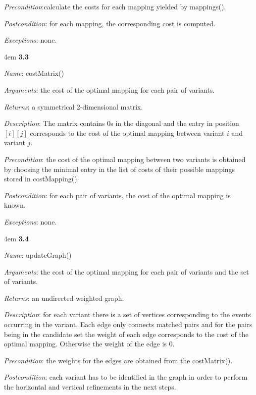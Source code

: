 \documentclass[notitlepage]{article}
\begin{document}
\begin{flushleft}
\textit{Precondition}:calculate the costs for each mapping yielded by mappings().

\textit{Postcondition}: for each mapping, the corresponding cost is computed.

\textit{Exceptions}: none.
\par
\endgroup


\medskip

\par
\begingroup
\leftskip4em
\textbf{3.3} 

\textit{Name}: costMatrix()

\textit{Arguments}: the cost of the optimal mapping for each pair of variants.

\textit{Returns}: a symmetrical 2-dimensional matrix.

\textit{Description}: The matrix contains 0s in the diagonal and the entry in position $[i][j]$ corresponds to the cost of the optimal mapping between variant $i$ and variant $j$. 

\textit{Precondition}: the cost of the optimal mapping between two variants is obtained by choosing the minimal entry in the list of costs of their possible mappings stored in costMapping().

\textit{Postcondition}: for each pair of variants, the cost of the optimal mapping is known.

\textit{Exceptions}: none.
\par
\endgroup


\medskip

\par
\begingroup
\leftskip4em
\textbf{3.4} 

\textit{Name}: updateGraph()

\textit{Arguments}: the cost of the optimal mapping for each pair of variants and the set of variants.

\textit{Returns}: an undirected weighted graph.

\textit{Description}: for each variant there is a set of vertices corresponding to the events occurring in the variant. Each edge only connects matched pairs and for the pairs being in the candidate set the weight of each edge corresponds to the cost of the optimal mapping. Otherwise the weight of the edge is 0.

\textit{Precondition}: the weights for the edges are obtained from the costMatrix().

\textit{Postcondition}: each variant has to be identified in the graph in order to perform the horizontal and vertical refinements in the next steps.


\end{flushleft}
\end{document}
